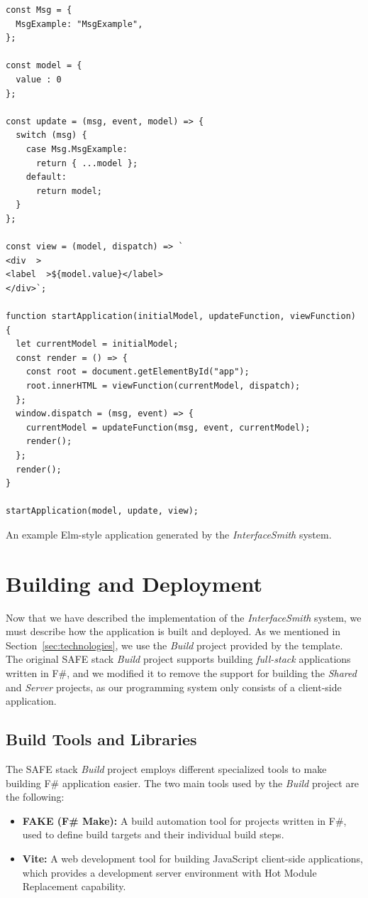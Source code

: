 \begin{listing}[H]
	\begin{lstlisting}
const Msg = {
  MsgExample: "MsgExample",
};

const model = {
  value : 0
};

const update = (msg, event, model) => {
  switch (msg) {
    case Msg.MsgExample:
      return { ...model };
    default:
      return model;
  }
};

const view = (model, dispatch) => `
<div  >
<label  >${model.value}</label>
</div>`;

function startApplication(initialModel, updateFunction, viewFunction) {
  let currentModel = initialModel;
  const render = () => {
    const root = document.getElementById("app");
    root.innerHTML = viewFunction(currentModel, dispatch);
  };
  window.dispatch = (msg, event) => {
    currentModel = updateFunction(msg, event, currentModel);
    render();
  };
  render();
}

startApplication(model, update, view);
	\end{lstlisting}
	\caption{An example Elm-style application generated by the \emph{InterfaceSmith} system.}\label{fig:code-generation}
\end{listing}


\clearpage
\section{Building and Deployment}
\label{sec:build}
Now that we have described the implementation of the \emph{InterfaceSmith} system, we must describe how the application is built and deployed.
As we mentioned in Section~\ref{sec:technologies}, we use the \emph{Build} project provided by the \citet{safestack} template.
The original SAFE stack \emph{Build} project supports building \emph{full-stack} applications written in F\#, and we modified it to remove the support for building
the \emph{Shared} and \emph{Server} projects, as our programming system only consists of a client-side application.
\medskip
\subsection{Build Tools and Libraries}
The SAFE stack \emph{Build} project employs different specialized tools to make building F\# application easier.
The two main tools used by the \emph{Build} project are the following:
\begin{itemize}
	\item \textbf{FAKE (F\# Make):} A build automation tool for projects written in F\#, used to define build targets and their individual build steps.
	\item \textbf{Vite:} A web development tool for building JavaScript client-side applications, which provides a development server environment with Hot Module Replacement capability.
\end{itemize}


